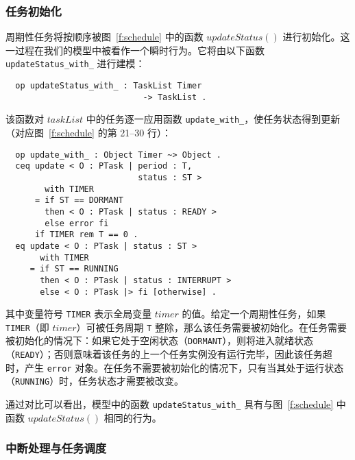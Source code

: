 \subsubsection{任务初始化}
\label{ss:init}
周期性任务将按顺序被图~\ref{f:schedule} 中的函数 $\mathit{updateStatus()}$ 进行初始化。这一过程在我们的模型中被看作一个瞬时行为。它将由以下函数 \verb|updateStatus_with_| 进行建模：
\begin{verbatim}
  op updateStatus_with_ : TaskList Timer 
                            -> TaskList . 
\end{verbatim}
该函数对 $\mathit{taskList}$ 中的任务逐一应用函数 \verb|update_with_|，使任务状态得到更新（对应图~\ref{f:schedule} 的第 21--30 行）：
\begin{verbatim}
  op update_with_ : Object Timer ~> Object .
  ceq update < O : PTask | period : T, 
                           status : ST > 
        with TIMER
      = if ST == DORMANT 
        then < O : PTask | status : READY >
        else error fi
      if TIMER rem T == 0 .
  eq update < O : PTask | status : ST > 
       with TIMER
     = if ST == RUNNING 
       then < O : PTask | status : INTERRUPT >
       else < O : PTask |> fi [otherwise] .
\end{verbatim}
其中变量符号 \verb|TIMER| 表示全局变量 $\mathit{timer}$ 的值。给定一个周期性任务，如果 \verb|TIMER|（即 $\mathit{timer}$）可被任务周期 \verb|T| 整除，那么该任务需要被初始化。在任务需要被初始化的情况下：如果它处于空闲状态（\verb|DORMANT|），则将进入就绪状态（\verb|READY|）；否则意味着该任务的上一个任务实例没有运行完毕，因此该任务超时，产生 \verb|error| 对象。在任务不需要被初始化的情况下，只有当其处于运行状态（\verb|RUNNING|）时，任务状态才需要被改变。

通过对比可以看出，模型中的函数 \verb|updateStatus_with_| 具有与图~\ref{f:schedule} 中函数 $\mathit{updateStatus()}$ 相同的行为。

\subsubsection{中断处理与任务调度}
\label{ss:inthandling}

